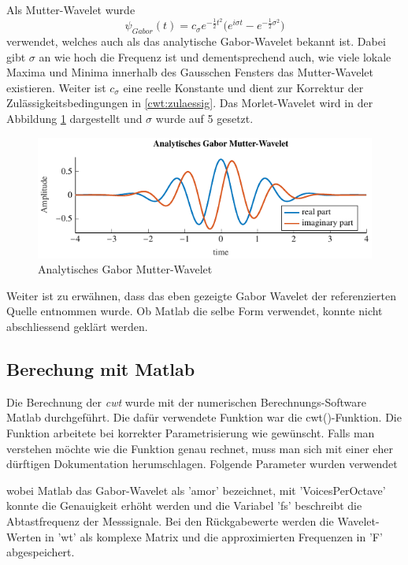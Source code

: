 \begin{refsection}
Als Mutter-Wavelet wurde 
\begin{equation}
\psi_{Gabor}(t) =  c_{\sigma} e^{-\frac{1}{2}t^2} \biggl(e^{i \sigma t}- e^{-\frac{1}{2} \sigma^2} \biggr)
\label{eq:morlet}
\end{equation} \cite{online:Morlet}
verwendet, welches auch als das analytische Gabor-Wavelet bekannt ist.
Dabei gibt $\sigma$ an wie hoch die Frequenz ist und dementsprechend auch, wie viele lokale Maxima und Minima innerhalb des Gausschen Fensters das Mutter-Wavelet existieren.
Weiter ist $c_{\sigma}$ eine reelle Konstante und dient zur Korrektur der Zulässigkeitsbedingungen in \ref{cwt:zulaessig}.
Das Morlet-Wavelet wird in der Abbildung \ref{fig:gabor_plot} \space dargestellt und $\sigma$ wurde auf 5 gesetzt.

\begin{figure}
\centering
\includegraphics[width=1\textwidth]{papers/wwt/images/gabor.pdf}
\caption{Analytisches Gabor Mutter-Wavelet}
\label{fig:gabor_plot}
\end{figure}

Weiter ist zu erwähnen, dass das eben gezeigte Gabor Wavelet der referenzierten Quelle entnommen wurde. Ob Matlab die selbe Form verwendet, konnte nicht abschliessend geklärt werden.

\subsection{Berechung mit Matlab}
Die Berechnung der \textit{cwt} wurde mit der numerischen Berechnungs-Software Matlab durchgeführt.
Die dafür verwendete Funktion war die cwt()-Funktion.
Die Funktion arbeitete bei korrekter Parametrisierung wie gewünscht.
Falls man verstehen möchte wie die Funktion genau rechnet, muss man sich mit einer eher dürftigen Dokumentation herumschlagen.
Folgende Parameter wurden verwendet

\label{fig:matlab_code_cwt}
wobei Matlab das Gabor-Wavelet als 'amor' bezeichnet, mit 'VoicesPerOctave' konnte die Genauigkeit erhöht werden und die Variabel 'fs' beschreibt die Abtastfrequenz der Messsignale.
Bei den Rückgabewerte werden die Wavelet-Werten in 'wt' als komplexe Matrix und die approximierten Frequenzen in 'F' abgespeichert.


\end{refsection}
